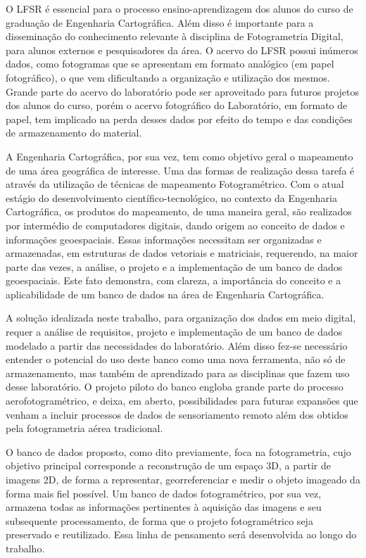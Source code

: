 O LFSR é essencial para o processo ensino-aprendizagem dos alunos do curso de graduação de Engenharia Cartográfica. Além disso é importante para a disseminação do conhecimento relevante à disciplina de Fotogrametria Digital, para alunos externos e pesquisadores da área. O acervo do LFSR possui inúmeros dados, como fotogramas que se apresentam em formato analógico (em papel fotográfico), o que vem dificultando a organização e utilização dos mesmos. Grande parte do acervo do laboratório pode ser aproveitado para futuros projetos dos alunos do curso, porém o acervo fotográfico do Laboratório, em formato de papel, tem implicado na perda desses dados por efeito do tempo e das condições de armazenamento do material.

A Engenharia Cartográfica, por sua vez, tem como objetivo geral o mapeamento de uma área geográfica de interesse. Uma das formas de realização dessa tarefa é através da utilização de técnicas de mapeamento Fotogramétrico. Com o atual estágio do desenvolvimento científico-tecnológico, no contexto da Engenharia Cartográfica, os produtos do mapeamento, de uma maneira geral, são realizados por intermédio de computadores digitais, dando origem ao conceito de dados e informações geoespaciais. Essas informações necessitam ser organizadas e armazenadas, em estruturas de dados vetoriais e matriciais, requerendo, na maior parte das vezes, a análise, o projeto e a implementação de um banco de dados geoespaciais. Este fato demonstra, com clareza, a importância do conceito e a aplicabilidade de um banco de dados na área de Engenharia Cartográfica.

A solução idealizada neste trabalho, para organização dos dados em meio digital, requer a análise de requisitos, projeto e implementação de um banco de dados modelado a partir das necessidades do laboratório. Além disso fez-se necessário entender o potencial do uso deste banco como uma nova ferramenta, não só de armazenamento, mas também de aprendizado para as disciplinas que fazem uso desse laboratório. 
O projeto piloto do banco engloba grande parte do processo aerofotogramétrico, e deixa, em aberto, possibilidades para futuras expansões que venham a incluir processos de dados de sensoriamento remoto além dos obtidos pela fotogrametria aérea tradicional.

O banco de dados proposto, como dito previamente, foca na fotogrametria, cujo objetivo principal corresponde a reconstrução de um espaço 3D, a partir de imagens 2D, de forma a representar, georreferenciar e medir o objeto imageado da forma mais fiel possível. Um banco de dados fotogramétrico, por sua vez, armazena todas as informações pertinentes à aquisição das imagens e seu subsequente processamento, de forma que o projeto fotogramétrico seja preservado e reutilizado. Essa linha de pensamento será desenvolvida ao longo do trabalho. 

